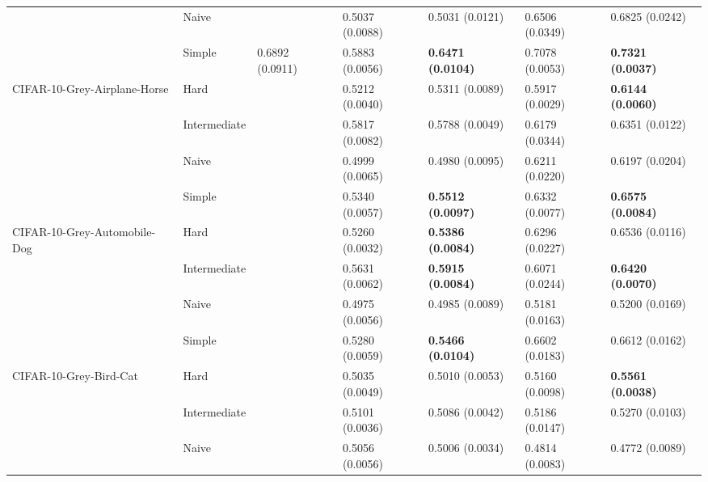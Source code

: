 \begin{tabular}{lllllll}
                 & Naive &                  &           0.5037 (0.0088) &           0.5031 (0.0121) &           0.6506 (0.0349) &           0.6825 (0.0242) \\
                 & Simple &  0.6892 (0.0911) &           0.5883 (0.0056) &  \textbf{0.6471 (0.0104)} &           0.7078 (0.0053) &  \textbf{0.7321 (0.0037)} \\
CIFAR-10-Grey-Airplane-Horse & Hard &                  &           0.5212 (0.0040) &           0.5311 (0.0089) &           0.5917 (0.0029) &  \textbf{0.6144 (0.0060)} \\
                 & Intermediate &                  &           0.5817 (0.0082) &           0.5788 (0.0049) &           0.6179 (0.0344) &           0.6351 (0.0122) \\
                 & Naive &                  &           0.4999 (0.0065) &           0.4980 (0.0095) &           0.6211 (0.0220) &           0.6197 (0.0204) \\
                 & Simple &                  &           0.5340 (0.0057) &  \textbf{0.5512 (0.0097)} &           0.6332 (0.0077) &  \textbf{0.6575 (0.0084)} \\
CIFAR-10-Grey-Automobile-Dog & Hard &                  &           0.5260 (0.0032) &  \textbf{0.5386 (0.0084)} &           0.6296 (0.0227) &           0.6536 (0.0116) \\
                 & Intermediate &                  &           0.5631 (0.0062) &  \textbf{0.5915 (0.0084)} &           0.6071 (0.0244) &  \textbf{0.6420 (0.0070)} \\
                 & Naive &                  &           0.4975 (0.0056) &           0.4985 (0.0089) &           0.5181 (0.0163) &           0.5200 (0.0169) \\
                 & Simple &                  &           0.5280 (0.0059) &  \textbf{0.5466 (0.0104)} &           0.6602 (0.0183) &           0.6612 (0.0162) \\
CIFAR-10-Grey-Bird-Cat & Hard &                  &           0.5035 (0.0049) &           0.5010 (0.0053) &           0.5160 (0.0098) &  \textbf{0.5561 (0.0038)} \\
                 & Intermediate &                  &           0.5101 (0.0036) &           0.5086 (0.0042) &           0.5186 (0.0147) &           0.5270 (0.0103) \\
                 & Naive &                  &           0.5056 (0.0056) &           0.5006 (0.0034) &           0.4814 (0.0083) &           0.4772 (0.0089) \\

\end{tabular}
